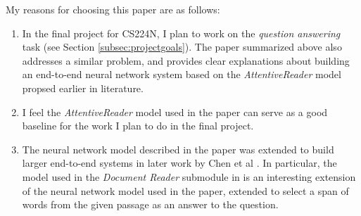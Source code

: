 My reasons for choosing this paper are as follows:
\begin{enumerate}
\item In the final project for CS224N, I plan to work on the \textit{question answering} task (see Section \ref{subsec:projectgoals}). The paper summarized above also addresses a similar problem, and provides clear explanations about building an end-to-end neural network system based on the \textit{AttentiveReader} model \cite{hermann2015teaching} propsed earlier in literature.
\item I feel the \textit{AttentiveReader} model used in the paper can serve as a good baseline for the work I plan to do in the final project.
\item The neural network model described in the paper was extended to build larger end-to-end systems in later work by Chen et al \cite{chen2017reading}. In particular, the model used in the \textit{Document Reader} submodule in \cite{chen2017reading} is an interesting extension of the neural network model used in the paper, extended to select a span of words from the given passage as an answer to the question.

\end{enumerate}

